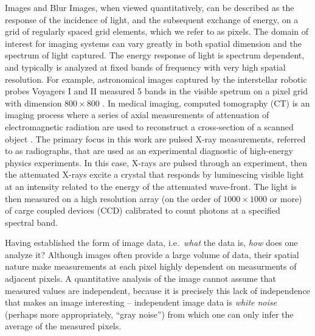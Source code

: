 \begin{chapter}{Images and Blur}
  Images, when viewed quantitatively, can be described as the response of the incidence of light, and the subsequent exchange of energy, on a grid of regularly spaced grid elements, which we refer to as pixels.
  The domain of interest for imaging systems can vary greatly in both spatial dimension and the spectrum of light captured. 
  The energy response of light is spectrum dependent, and typically is analyzed at fixed bands of frequency with very high spatial resolution.
  For example, astronomical images captured by the interstellar robotic probes Voyagers I and II measured 5 bands in the visible spetrum on a pixel grid with dimension $800 \times 800$ \citep{voyager}.
  In medical imaging, computed tomography (CT) is an imaging process where a series of axial measurements of attenuation of electromagnetic radiation are used to reconstruct a cross-section of a scanned object \citep{epstein2008}.
  The primary focus in this work are pulsed X-ray measurements, referred to as radiographs, that are used as an experimental diagnostic of high-energy physics experiments.  
  In this case, X-rays are pulsed through an experiment, then the attenuated X-rays excite a crystal that responds by luminescing visible light at an intensity related to the energy of the attenuated wave-front.  
  The light is then measured on a high resolution array (on the order of $1000\times1000$ or more) of carge coupled devices (CCD) calibrated to count photons at a specified spectral band.

  Having established the form of image data, i.e.~\emph{what} the data is, \emph{how} does one analyze it?
  Although images often provide a large volume of data, their spatial nature make measurements at each pixel highly dependent on measurments of adjacent pixels.
  A quantitative analysis of the image cannot assume that measured values are independent, because it is precisely this lack of independence that makes an image interesting -- independent image data is \emph{white noise} (perhaps more appropriately, ``gray noise'') from which one can only infer the average of the measured pixels.


\end{chapter}

